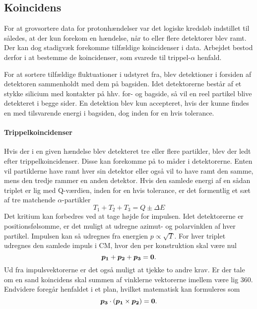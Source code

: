 \subsection{Koincidens}
\label{sec:koincidens}
For at grovsortere data for protonhændelser var det logiske kredsløb indstillet til \lAND således,
at der kun forekom en hændelse, når to eller flere detektorer blev ramt. Der kan dog stadigvæk
forekomme tilfældige koincidenser i data. Arbejdet bestod derfor i at bestemme de
koincidenser, som svarede til trippel-$\alpha$ henfald.

For at sortere tilfældige fluktuationer i udstyret fra, blev detektioner i forsiden af detektoren
sammenholdt med dem på bagsiden. Idet detektorerne består af et stykke silicium med kontakter på
hhv. for- og bagside, så vil en reel partikel blive detekteret i begge sider. En detektion blev kun
accepteret, hvis der kunne findes en med tilsvarende energi i bagsiden, dog inden for en hvis
tolerance.

\paragraph{Trippelkoincidenser}
\label{sec:trippelkoincidenser}
Hvis der i en given hændelse blev detekteret tre eller flere partikler, blev der ledt efter
trippelkoincidenser. Disse kan forekomme på to måder i detektorerne. Enten vil partiklerne have ramt
hver sin detektor eller også vil to have ramt den samme, mens den tredje rammer en anden
detektor. Hvis den samlede energi af en sådan triplet er lig med Q-værdien, inden for en hvis
tolerance, er det formentlig et sæt af tre matchende $\alpha$-partikler
\begin{equation}
  \label{eq:trippelE}
  T_{1} + T_{2} + T_{3} = Q \pm \Delta E
\end{equation}
Det kritium kan forbedres ved at tage højde for impulsen. Idet detektorerne er positionsfølsomme, er
det muligt at udregne azimut- og polarvinklen af hver partikel. Impulsen kan så udregnes fra
energien $p \propto \sqrt{T}$. For hver triplet udregnes den samlede impuls i CM, hvor den per
konstruktion skal være nul
\begin{equation}
  \label{eq:pCMnul}
  \bm{p_{1}} + \bm{p_{2}} + \bm{p_{3}} = \bm{0}.
\end{equation}
Ud fra impulsvektorerne er det også muligt at tjekke to andre krav. Er der tale om en sand
koincidens skal summen af vinklerne vektorerne imellem være lig 360\degree. Endvidere foregår
henfaldet i et plan, hvilket matematisk kan formuleres som
\begin{equation}
  \bm{p_{3}} \cdot (\bm{p_{1}} \times \bm{p_{2}}) = \bm{0}.
\end{equation}


